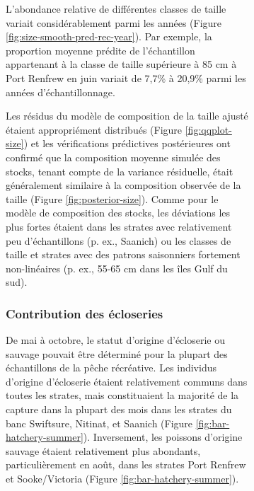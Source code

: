 \begin{figure}[H]
\begin{figure}[H]
L'abondance relative de différentes classes de taille variait considérablement parmi les années (Figure \ref{fig:size-smooth-pred-rec-year}). Par exemple, la proportion moyenne prédite de l'échantillon appartenant à la classe de taille supérieure à 85 cm à Port Renfrew en juin variait de 7,7\% à 20,9\% parmi les années d'échantillonnage.

Les résidus du modèle de composition de la taille ajusté étaient appropriément distribués (Figure \ref{fig:qqplot-size}) et les vérifications prédictives postérieures ont confirmé que la composition moyenne simulée des stocks, tenant compte de la variance résiduelle, était généralement similaire à la composition observée de la taille (Figure \ref{fig:posterior-size}). Comme pour le modèle de composition des stocks, les déviations les plus fortes étaient dans les strates avec relativement peu d'échantillons (p. ex., Saanich) ou les classes de taille et strates avec des patrons saisonniers fortement non-linéaires (p. ex., 55-65 cm dans les îles Gulf du sud).

\subsubsection{Contribution des écloseries}

De mai à octobre, le statut d'origine d'écloserie ou sauvage pouvait être déterminé pour la plupart des échantillons de la pêche récréative. Les individus d'origine d'écloserie étaient relativement communs dans toutes les strates, mais constituaient la majorité de la capture dans la plupart des mois dans les strates du banc Swiftsure, Nitinat, et Saanich (Figure \ref{fig:bar-hatchery-summer}). Inversement, les poissons d'origine sauvage étaient relativement plus abondants, particulièrement en août, dans les strates Port Renfrew et Sooke/Victoria (Figure \ref{fig:bar-hatchery-summer}).


\end{figure}
\end{figure}
